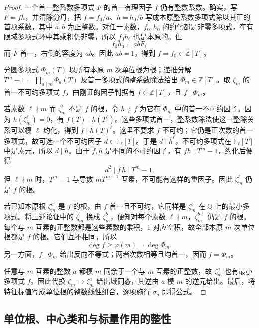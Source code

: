 \begin{proof}
	一个首一整系数多项式 \(F\) 的首一有理因子 \(f\) 仍有整数系数。确实，写 \(F=fh\)，并清除分母，把 \(f=f_0/a\)、\(h=h_0/b\) 写成本原整系数多项式除以其正的首项系数，其中 \(a,b\) 为正整数。对任一素数，\(f_0,h_0\) 的约化都是非零多项式，在有限域多项式环中其乘积仍非零，所以 \(f_0h_0\) 也是本原的。但
	\[
		f_0h_0=abF,
	\]
	而 \(F\) 首一，右侧的容度为 \(ab\)。因此 \(ab=1\)，得到 \(f=f_0\in\mathbb Z[T]\)。

	分圆多项式 \(\Phi_m(T)\) 以所有本原 \(m\) 次单位根为根；递推分解 \(T^m-1=\prod_{d\mid m}\Phi_d(T)\) 及首一多项式的整系数除法给出 \(\Phi_m\in\mathbb Z[T]\)。取 \(\zeta_m\) 的首一不可约多项式 \(f\)，由刚证的因子判据有 \(f\in\mathbb Z[T]\)，且 \(f\mid\Phi_m\)。

	若素数 \(\ell\nmid m\) 而 \(\zeta_m^\ell\) 不是 \(f\) 的根，令 \(h\ne f\) 为它在 \(\Phi_m\) 中的首一不可约因子。因为 \(h(\zeta_m^\ell)=0\)，有 \(f(T)\mid h(T^\ell)\)。这些多项式首一，整系数除法使这一整除关系可以模 \(\ell\) 约化，得到 \(\overline f\mid\overline h(T)^\ell\)。这里不要求 \(\overline f\) 不可约；它仍是正次数的首一多项式，故可选一个不可约因子 \(d\in\mathbb F_\ell[T]\)。于是 \(d\mid\overline h^\ell\)，不可约多项式在 \(\mathbb F_\ell[T]\) 中是素元，所以 \(d\mid\overline h\)。由于 \(f,h\) 是不同的不可约因子，有 \(fh\mid T^m-1\)，约化后便得
	\[
		d^2\mid\overline f\,\overline h\mid T^m-1.
	\]
	但 \(\ell\nmid m\) 时，\(T^m-1\) 与导数 \(mT^{m-1}\) 互素，不可能有这样的重因子。因此 \(\zeta_m^\ell\) 仍是 \(f\) 的根。

	若已知本原根 \(\zeta_m^b\) 是 \(f\) 的根，由 \(f\) 首一且不可约，它同样是 \(\zeta_m^b\) 在 \(\mathbb Q\) 上的最小多项式。将上述论证中的 \(\zeta_m\) 换成 \(\zeta_m^b\)，便知对每个素数 \(\ell\nmid m\)，\(\zeta_m^{b\ell}\) 仍是 \(f\) 的根。每个与 \(m\) 互素的正整数都是这些素数的乘积，\(1\) 对应空积，故全部本原 \(m\) 次单位根都是 \(f\) 的根。它们互不相同，所以
	\[
		\deg f\ge\varphi(m)=\deg\Phi_m.
	\]
	另一方面，\(f\mid\Phi_m\) 给出反向不等式；两者次数相等且均首一，因而 \(f=\Phi_m\)。

	任意与 \(m\) 互素的整数 \(a\) 都模 \(m\) 同余于一个与 \(m\) 互素的正整数，故 \(\zeta_m^a\) 也有最小多项式 \(f\)。因此代换 \(\zeta_m\mapsto\zeta_m^a\) 给出域同态，其逆由 \(a\) 模 \(m\) 的逆元给出。最后，将特征标值写成单位根的整数线性组合，逐项施行 \(\sigma_a\) 即得公式。
\end{proof}

\subsection{单位根、中心类和与标量作用的整性}
\label{b5:subsec:0501:05}

